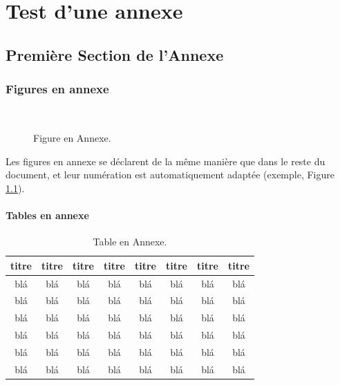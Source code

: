 \documentclass[letterpaper%
, twoside%
, 12pt%
, these%
, francais
, creativecommons, hyperref, withAlgo2e%
]{thETS}
\begin{document}
% 

\chapter{Test d'une annexe} 


\section{Première Section de l'Annexe}


\subsection{Figures en annexe}

\begin{figure}
	\centering
	 \\ \parbox{0.75\textwidth}{\caption{Figure en Annexe.}\label{fig:testAp}}
\end{figure}

Les figures en annexe se déclarent de la même manière que dans le reste du document, et leur numération est automatiquement adaptée (exemple, Figure \ref{fig:testAp}).

\subsubsection{Tables en annexe}

\begin{table}
		\parbox{0.65\textwidth}{\caption{Table en Annexe.}\label{tab:testAp}}

		\begin{tabular}{|c|c|c|c|c|c|c|c|}
		\hline
			{\bf titre} & {\bf titre} & {\bf titre} & {\bf titre} & {\bf titre} & {\bf titre} & {\bf titre} & {\bf titre} \\
	  \hline
			blá & blá & blá & blá & blá & blá & blá & blá \\
	  \hline
			blá & blá & blá & blá & blá & blá & blá & blá \\
	  \hline
			blá & blá & blá & blá & blá & blá & blá & blá \\
	  \hline
			blá & blá & blá & blá & blá & blá & blá & blá \\
	  \hline
			blá & blá & blá & blá & blá & blá & blá & blá \\
	  \hline
			blá & blá & blá & blá & blá & blá & blá & blá \\
	  \hline
		\end{tabular}
\end{table}
\end{document}
